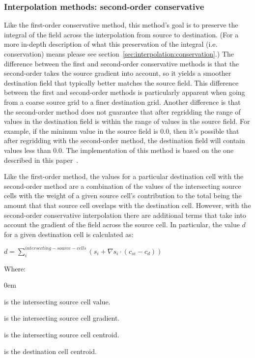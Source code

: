 \subsubsection{Interpolation methods: second-order conservative}\label{sec:interpolation:conserve_2ndorder}
 Like the first-order conservative method, this method's goal is to preserve the integral of the field across the interpolation from source to destination.  
 (For a more in-depth description of what this preservation of the integral (i.e. conservation) means please see section~\ref{sec:interpolation:conservation}.)  The difference between the first and second-order conservative methods is that the second-order takes the source gradient into account, so
 it yields a smoother destination field that typically better matches the source field. This difference between the first and second-order methods 
 is particularly apparent when going from a coarse source grid to a finer destination grid. Another difference is that the second-order method
  does not guarantee that after regridding the range of values in the destination field is within the range of 
 values in the source field. For example, if the mininum value in the source field is 0.0, then it's possible that after regridding with the 
 second-order method, the destination field will contain values less than 0.0.  The implementation of this method is based on the one 
  described in this paper~\cite{ConservativeOrder2}. 


 Like the first-order method, the values for a particular destination cell with the second-order method
 are a combination of the values of the intersecting source cells with the weight of a given source cell's contribution to the total 
 being the amount that that source cell overlaps with the destination cell. 
 However, with the second-order conservative interpolation there are additional terms that take into account the gradient of the field 
 across the source cell. In particular, the value $d$ for a given destination cell is calculated as:
 
 $d=\sum^{intersecting-source-cells}_{i}(s_{i}+\nabla s_{i} \cdot (c_{si}-c_{d}))$

\smallskip

Where:
\vspace{-1em}
\begin{description}
  \itemsep0em
  \item[$s_{i}$] is the intersecting source cell value. 
  \item[$\nabla s_{i}$] is the intersecting source cell gradient. 
  \item[$c_{si}$] is the intersecting source cell centroid. 
  \item[$c_{d}$] is the destination cell centroid. 
\end{description}

